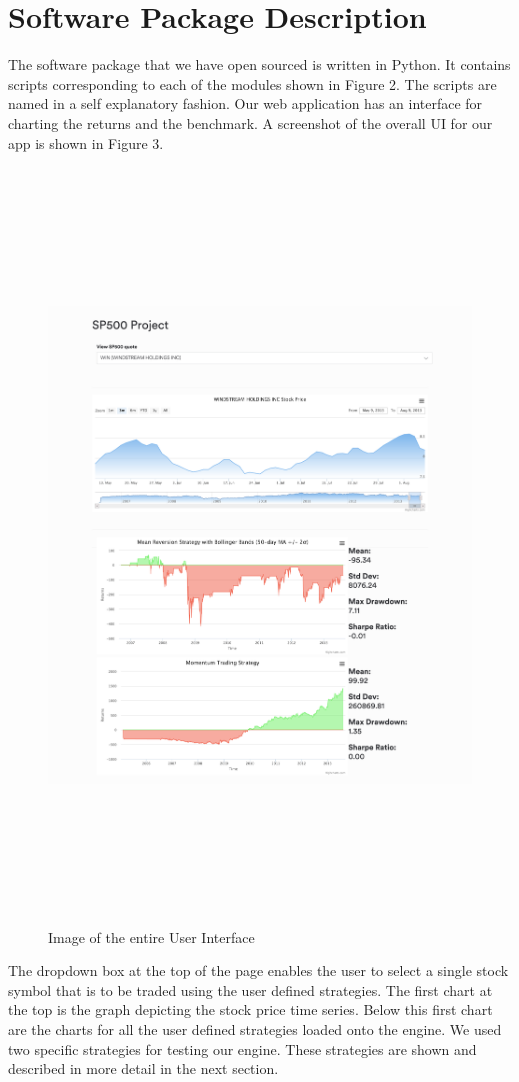 \documentclass[10pt, conference, compsocconf]{IEEEtran}
\begin{document}
\section{Software Package Description}
The software package that we have open sourced is written in Python. It contains scripts corresponding to each of the modules shown in Figure 2. The scripts are named in a self explanatory fashion. Our web application has an interface for charting the returns and the benchmark. A screenshot of the overall UI for our app is shown in Figure 3.
\begin{figure}
  \includegraphics[width=\textwidth,height=20cm]{Figure3}
  \caption{Image of the entire User Interface}
\end{figure}

The dropdown box at the top of the page enables the user to select a single stock symbol that is to be traded using the user defined strategies. The first chart at the top is the graph depicting the stock price time series. Below this first chart are the charts for all the user defined strategies loaded onto the engine. We used two specific strategies for testing our engine. These strategies are shown and described in more detail in the next section.
\end{document}
